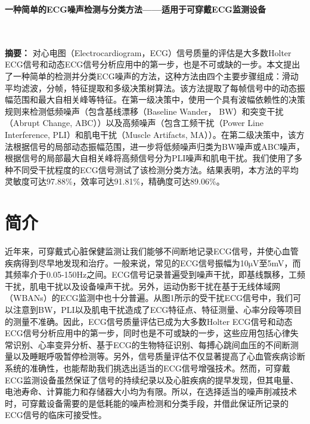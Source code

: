 \setcounter{page}{1}
\begin{center}
\xiaosihao
\textbf{一种简单的ECG噪声检测与分类方法——适用于可穿戴ECG监测设备\\}
~~\\
~~\\
\wuhao
\noindent
\begin{minipage}{\linewidth}
\textbf{摘要：}
\kaishu
对心电图（Electrocardiogram，ECG）信号质量的评估是大多数Holter ECG信号和动态ECG信号分析应用中的第一步，也是不可或缺的一步。本文提出了一种简单的检测并分类ECG噪声的方法，这种方法由四个主要步骤组成：滑动平均滤波，分帧，特征提取和多级决策树算法。该方法提取了每帧信号中的动态振幅范围和最大自相关峰等特征。在第一级决策中，使用一个具有波幅依赖性的决策规则来检测低频噪声（包含基线漂移（Baseline Wander， BW）和突变干扰（Abrupt Change, ABC））以及高频噪声（包含工频干扰（Power Line Interference, PLI）和肌电干扰（Muscle Artifacts, MA））。在第二级决策中，该方法根据信号的局部动态振幅范围，进一步将低频噪声归类为BW噪声或ABC噪声，根据信号的局部最大自相关峰将高频信号分为PLI噪声和肌电干扰。我们使用了多种不同受干扰程度的ECG信号测试了该检测分类方法。结果表明，本方法的平均灵敏度可达97.88\%，效率可达91.81\%，精确度可达89.06\%。
~~\\
\end{minipage}
\end{center}

\wuhao
\section{简介}

近年来，可穿戴式心脏保健监测让我们能够不间断地记录ECG信号，并使心血管疾病得到尽早地发现和治疗。一般来说，常见的ECG信号振幅为10$\mathrm{\mu}$V至5mV，而其频率介于0.05-150Hz之间。ECG信号记录普遍受到噪声干扰，即基线飘移，工频干扰，肌电干扰以及设备噪声干扰。另外，运动伪影干扰在基于无线体域网（WBANs）的ECG监测中也十分普遍。从图1所示的受干扰ECG信号中，我们可以注意到BW，PLI以及肌电干扰造成了ECG特征点、特征测量、心率分段等项目的测量不准确。因此，ECG信号质量评估已成为大多数Holter ECG信号和动态 ECG信号分析应用中的第一步，同时也是不可或缺的一步，这些应用包括心律失常识别、心率变异分析、基于ECG的生物特征识别、每搏心跳间血压的不间断测量以及睡眠呼吸暂停检测等。另外，信号质量评估不仅显著提高了心血管疾病诊断系统的准确性，也能帮助我们挑选出适当的ECG信号增强技术。然而，可穿戴ECG监测设备虽然保证了信号的持续纪录以及心脏疾病的提早发现，但其电量、电池寿命、计算能力和存储器大小均为有限。所以，在选择适当的噪声削减技术时，可穿戴设备需要的是低耗能的噪声检测和分类手段，并借此保证所记录的ECG信号的临床可接受性。

